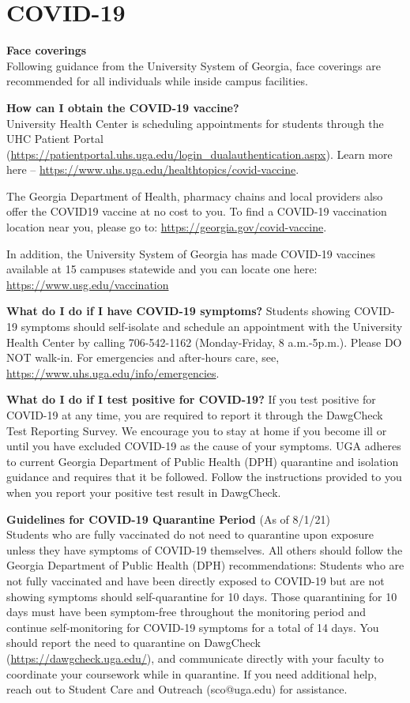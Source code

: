 \documentclass[12pt]{article}
\begin{document}
\clearpage

\section*{\normalsize COVID-19}

{\bf Face coverings \\}
Following guidance from the University System of Georgia, face
coverings are recommended for all individuals while inside campus
facilities. 

{\bf How can I obtain the COVID-19 vaccine? \\}
University Health Center is scheduling appointments for students
through the UHC Patient Portal
(\url{https://patientportal.uhs.uga.edu/login\_dualauthentication.aspx}). Learn
more here – \url{https://www.uhs.uga.edu/healthtopics/covid-vaccine}. 

The Georgia Department of Health, pharmacy chains and local providers
also offer the COVID19 vaccine at no cost to you. To find a COVID-19
vaccination location near you, please go to:
\url{https://georgia.gov/covid-vaccine}. 

In addition, the University System of Georgia has made COVID-19
vaccines available at 15 campuses statewide and you can locate one
here: \url{https://www.usg.edu/vaccination}

{\bf What do I do if I have COVID-19 symptoms?}
Students showing COVID-19 symptoms should self-isolate and schedule an
appointment with the University Health Center by calling 706-542-1162
(Monday-Friday, 8 a.m.-5p.m.). Please DO NOT walk-in. For emergencies
and after-hours care, see, \url{https://www.uhs.uga.edu/info/emergencies}.

{\bf What do I do if I test positive for COVID-19?}
If you test positive for COVID-19 at any time, you are required to
report it through the DawgCheck Test Reporting Survey. We encourage
you to stay at home if you become ill or until you have excluded
COVID-19 as the cause of your symptoms. UGA adheres to current Georgia
Department of Public Health (DPH) quarantine and isolation guidance
and requires that it be followed. Follow the instructions provided to
you when you report your positive test result in DawgCheck.

{\bf Guidelines for COVID-19 Quarantine Period} (As of 8/1/21) \\
Students who are fully vaccinated do not need to quarantine upon
exposure unless they have symptoms of COVID-19 themselves. All others
should follow the Georgia Department of Public Health (DPH)
recommendations: Students who are not fully vaccinated and have been
directly exposed to COVID-19 but are not showing symptoms should
self-quarantine for 10 days. Those quarantining for 10 days must have
been symptom-free throughout the monitoring period and continue
self-monitoring for COVID-19 symptoms for a total of 14 days. You
should report the need to quarantine on DawgCheck
(\url{https://dawgcheck.uga.edu/}), and communicate directly with your
faculty to coordinate your coursework while in quarantine. If you need
additional help, reach out to Student Care and Outreach (sco@uga.edu)
for assistance. 
\end{document}
